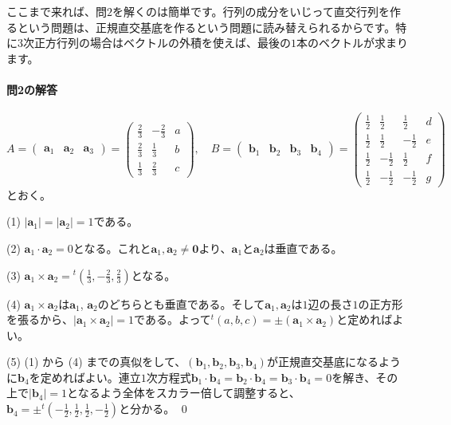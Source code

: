 ここまで来れば、問$2$を解くのは簡単です。行列の成分をいじって直交行列を作るという問題は、正規直交基底を作るという問題に読み替えられるからです。特に$3$次正方行列の場合はベクトルの外積を使えば、最後の$1$本のベクトルが求まります。

\paragraph{問2の解答}
\[
A =
\begin{pmatrix}
\bm{a}_1 & \bm{a}_2 & \bm{a}_3
\end{pmatrix}
=
\begin{pmatrix}
\frac{2}{3} & -\frac{2}{3} & a \\
\frac{2}{3} & \frac{1}{3} & b \\
\frac{1}{3} & \frac{2}{3} & c
\end{pmatrix}, \quad
B =
\begin{pmatrix}
\bm{b}_1 & \bm{b}_2 & \bm{b}_3 & \bm{b}_4
\end{pmatrix}
=
\begin{pmatrix}
\frac{1}{2} & \frac{1}{2} & \frac{1}{2} & d \\
\frac{1}{2} & \frac{1}{2} & -\frac{1}{2} & e \\
\frac{1}{2} & -\frac{1}{2} & \frac{1}{2} & f \\
\frac{1}{2} & -\frac{1}{2} & -\frac{1}{2} & g
\end{pmatrix}
\]
とおく。

\noindent (1) $|\bm{a}_1| = |\bm{a}_2| = 1$である。

\noindent (2) $\bm{a}_1 \cdot \bm{a}_2 = 0$となる。これと$\bm{a}_1, \bm{a}_2 \neq \bm{0}$より、$\bm{a}_1$と$\bm{a}_2$は垂直である。

\noindent (3) $\bm{a}_1 \times \bm{a}_2 = {}^t(\frac{1}{3}, -\frac{2}{3}, \frac{2}{3})$となる。

\noindent (4) $\bm{a}_1 \times \bm{a}_2$は$\bm{a}_1$, $\bm{a}_2$のどちらとも垂直である。そして$\bm{a}_1, \bm{a}_2$は$1$辺の長さ$1$の正方形を張るから、$|\bm{a}_1 \times \bm{a}_2| = 1$である。よって${}^t (a, b, c) = \pm(\bm{a}_1 \times \bm{a}_2)$と定めればよい。

\noindent (5) (1) から (4) までの真似をして、$(\bm{b}_1, \bm{b}_2, \bm{b}_3, \bm{b}_4)$が正規直交基底になるように$\bm{b}_4$を定めればよい。連立$1$次方程式$\bm{b}_1 \cdot \bm{b}_4 = \bm{b}_2 \cdot \bm{b}_4 = \bm{b}_3 \cdot \bm{b}_4 = 0$を解き、その上で$|\bm{b}_4| = 1$となるよう全体をスカラー倍して調整すると、$\bm{b}_4 = \pm {}^t( -\frac{1}{2}, \frac{1}{2}, \frac{1}{2}, -\frac{1}{2})$と分かる。 \qed


